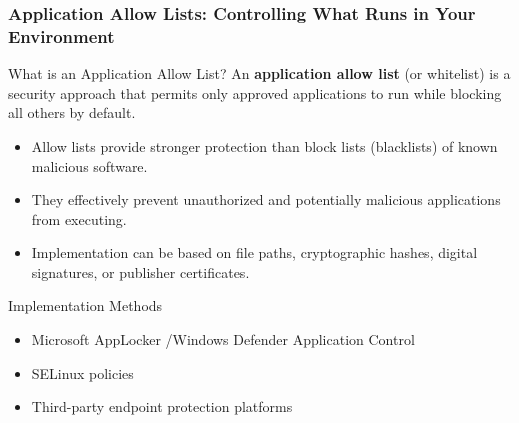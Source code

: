 \documentclass{beamer}
\begin{document}
    \begin{frame}
    \frametitle{Application Allow Lists: Controlling What Runs in Your Environment}
    
    \begin{block}{What is an Application Allow List?}
    An \textbf{application allow list} (or whitelist) is a security approach that permits only approved applications to run while blocking all others by default.
    \end{block}
    
    \begin{itemize}
    \item Allow lists provide stronger protection than block lists (blacklists) of known malicious software.
    \item They effectively prevent unauthorized and potentially malicious applications from executing.
    \item Implementation can be based on file paths, cryptographic hashes, digital signatures, or publisher certificates.
    \end{itemize}
    
    \begin{exampleblock}{Implementation Methods}
    \begin{itemize}
    \item Microsoft AppLocker /Windows Defender Application Control
    \item SELinux policies
    \item Third-party endpoint protection platforms
    \end{itemize}
    \end{exampleblock}
    \end{frame}
    
\end{document}
